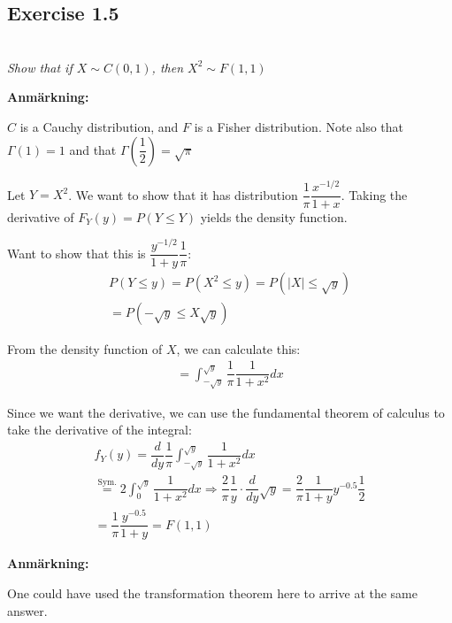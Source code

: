 \subsection{Exercise 1.5}\hfill\\
\textit{Show that if $X\sim C(0,1)$, then $X^2\sim F(1,1)$}
\par\bigskip
\textbf{Anmärkning:}\par
\noindent $C$ is a Cauchy distribution, and $F$ is a Fisher distribution. Note also that $\Gamma(1) = 1$ and that $\Gamma\left(\dfrac{1}{2}\right)=\sqrt{\pi}$
\par\bigskip
\noindent Let $Y= X^2$. We want to show that it has distribution $\dfrac{1}{\pi}\dfrac{x^{-1/2}}{1+x}$. Taking the derivative of $F_Y(y) = P(Y\leq Y)$ yields the density function.\par
\noindent Want to show that this is $\dfrac{y^{-1/2}}{1+y}\dfrac{1}{\pi}$:
\begin{equation*}
  \begin{gathered}
    P(Y\leq y) = P(X^2\leq y) = P(\left|X\right|\leq \sqrt{y})\\
    = P(-\sqrt{y}\leq X \sqrt{y})
  \end{gathered}
\end{equation*}\par
\noindent From the density function of $X$, we can calculate this:
\begin{equation*}
  \begin{gathered}
    = \int_{-\sqrt{y}}^{\sqrt{y}}\dfrac{1}{\pi}\dfrac{1}{1+x^2}dx
  \end{gathered}
\end{equation*}\par
\noindent Since we want the derivative, we can use the fundamental theorem of calculus to take the derivative of the integral:
\begin{equation*}
  \begin{gathered}
    f_Y(y) = \dfrac{d}{dy}\dfrac{1}{\pi}\int_{-\sqrt{y}}^{\sqrt{y}}\dfrac{1}{1+x^2}dx\\
    \stackrel{\text{Sym.}}{=} 2\int_{0}^{\sqrt{y}}\dfrac{1}{1+x^2}dx \Rightarrow \dfrac{2}{\pi}\dfrac{1}{y}\cdot \dfrac{d}{dy}\sqrt{y} = \dfrac{2}{\pi}\dfrac{1}{1+y}y^{-0.5}\dfrac{1}{2}\\
    = \dfrac{1}{\pi}\dfrac{y^{-0.5}}{1+y} = F(1,1)
  \end{gathered}
\end{equation*}
\par\bigskip
\noindent\textbf{Anmärkning:}\par
\noindent One could have used the transformation theorem here to arrive at the same answer. 
\par\bigskip
